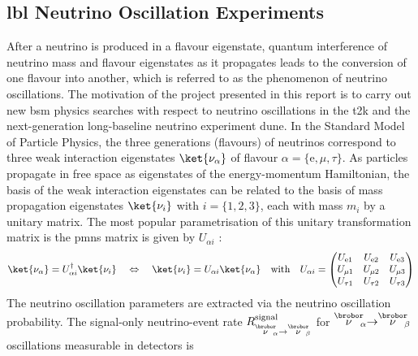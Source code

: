 \subsection{\texorpdfstring{\acrlong{lbl}}{TEXT} Neutrino Oscillation Experiments}\label{subsec:lbl_osc}
%
%
After a neutrino is produced in a flavour eigenstate, quantum interference of neutrino mass and flavour eigenstates as it propagates leads to the conversion of one flavour into another, which is referred to as the phenomenon of neutrino oscillations. The motivation of the project presented in this report is to carry out new \acrfull{bsm} physics searches with respect to neutrino oscillations in the \acrfull{t2k} and the next-generation long-baseline neutrino experiment \acrfull{dune}.
In the Standard Model of Particle Physics, the three generations (flavours) of neutrinos correspond to three weak interaction eigenstates $\ket{\nu_\alpha}$ of flavour $\alpha = \{\text{e},\mu,\tau\}$. As particles propagate in free space as eigenstates of the energy-momentum Hamiltonian, the basis of the weak interaction eigenstates can be related to the basis of mass propagation eigenstates $\ket{\nu_i}$ with $i=\{1,2,3\}$, each with mass $m_i$ by a unitary matrix. The most popular parametrisation of this unitary transformation matrix is the \acrfull{pmns} matrix is given by $U_{\alpha i}$ \cite{Kayser:2005cd}:
\vspace{-2mm}%
%
\begin{align} \label{pmns}
\ket{\nu_\alpha} =  U^\dagger_{\alpha i}\ket{\nu_i} \quad \Leftrightarrow \quad \ket{\nu_i} =  U_{\alpha i}\ket{\nu_\alpha} \quad 
\text{with} \quad U_{\alpha i} =
\begin{pmatrix}
    U_{\text{e}1} & U_{\text{e}2} & U_{\text{e}3} \\
    U_{\mu 1} & U_{\mu 2} & U_{\mu 3} \\
    U_{\tau 1} & U_{\tau 2} & U_{\tau 3}
\end{pmatrix}
\end{align}
%
The neutrino oscillation parameters are extracted via the neutrino oscillation probability. %
The signal-only neutrino-event rate $R^\text{signal}_{\overset{\brobor}{\nu}_{\hspace{-1mm}\alpha} \rightarrow \overset{\brobor}{\nu}_{\hspace{-1mm}\beta}}$ for $\overset{\brobor}{\nu}_{\hspace{-1mm}\alpha} \hspace{-1mm} \rightarrow \hspace{-1mm} \overset{\brobor}{\nu}_{\hspace{-1mm}\beta}$ oscillations measurable in detectors is \cite{doi:10.1146/annurev-nucl-101917-020930}
